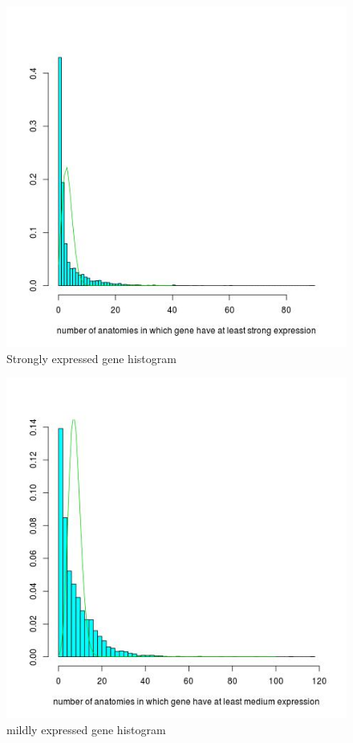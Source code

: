 \documentclass{article}
\begin{document}
\begin{figure}
	\begin{center}
		\includegraphics[scale=0.5]{strongExpressed.jpg}
	\end{center}
	\caption{Strongly expressed  gene histogram }
	\label{fig:strongHist}
\end{figure}

\begin{figure}	
	\begin{center}
		\includegraphics[scale=0.5]{midlyExpressed.jpg}
	\end{center}
	\caption{mildly expressed gene histogram}
	\label{fig:mildlyHist}
\end{figure}
\end{document}
